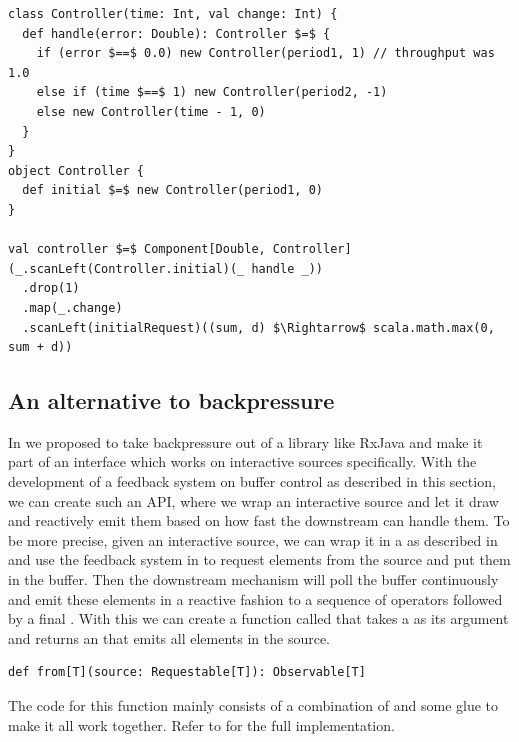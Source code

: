 \begin{minipage}{\linewidth}
\begin{lstlisting}[style=ScalaStyle, caption={Controller implementation for controlling the buffer}, label={lst:buffer-controller}]
class Controller(time: Int, val change: Int) {
  def handle(error: Double): Controller $=$ {
    if (error $==$ 0.0) new Controller(period1, 1) // throughput was 1.0
    else if (time $==$ 1) new Controller(period2, -1)
    else new Controller(time - 1, 0)
  }
}
object Controller {
  def initial $=$ new Controller(period1, 0)
}

val controller $=$ Component[Double, Controller](_.scanLeft(Controller.initial)(_ handle _))
  .drop(1)
  .map(_.change)
  .scanLeft(initialRequest)((sum, d) $\Rightarrow$ scala.math.max(0, sum + d))
\end{lstlisting}
\end{minipage}

\subsection{An alternative to backpressure}
In  we proposed to take backpressure out of a library like RxJava and make it part of an interface which works on interactive sources specifically. With the development of a feedback system on buffer control as described in this section, we can create such an API, where we wrap an interactive source and let it draw and reactively emit them based on how fast the downstream can handle them. To be more precise, given an interactive source, we can wrap it in a  as described in  and use the feedback system in  to request elements from the source and put them in the buffer. Then the downstream mechanism will poll the buffer continuously and emit these elements in a reactive fashion to a sequence of operators followed by a final \obv. With this we can create a function called  that takes a  as its argument and returns an  that emits all elements in the source.

\begin{lstlisting}[style=InlineScalaStyle]
def from[T](source: Requestable[T]): Observable[T]
\end{lstlisting}

The code for this function mainly consists of a combination of  and some glue to make it all work together. Refer to  for the full implementation.

